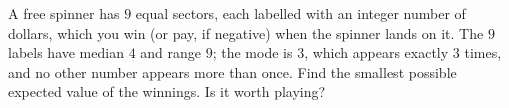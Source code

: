 A free spinner has $9$ equal sectors, each labelled with an integer number of dollars, which you win (or pay, if negative) when the spinner lands on it. The $9$ labels have median $4$ and range $9$; the mode is $3$, which appears exactly $3$ times, and no other number appears more than once. Find the smallest possible expected value of the winnings. Is it worth playing?
